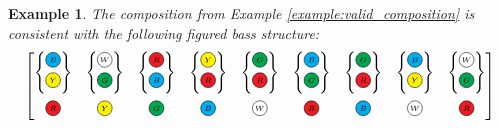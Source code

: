 \documentclass{scrartcl}
\newcommand{\RRR}{
  \begin{tikzpicture}
    \node[circle, draw, fill=Red, inner sep= 0pt, text width=1em, align=center] (n) at (0,0) {$\scriptscriptstyle R$};
  \end{tikzpicture}
}
\newcommand{\WWW}{
  \begin{tikzpicture}
    \node[circle, draw, fill=White,  inner sep= 0pt, text width=1em, align=center] (n) at (0,0) {$\scriptscriptstyle W$};
  \end{tikzpicture}
}
\newcommand{\BBB}{
  \begin{tikzpicture}
    \node[circle, draw, fill=Cyan,  inner sep= 0pt, text width=1em, align=center] (n) at (0,0) {$\scriptscriptstyle B$};
  \end{tikzpicture}
}
\newcommand{\GGG}{
  \begin{tikzpicture}
    \node[circle, draw, fill=Green,  inner sep= 0pt, text width=1em, align=center] (n) at (0,0) {$\scriptscriptstyle G$};
  \end{tikzpicture}
}
\newcommand{\YYY}{
  \begin{tikzpicture}
    \node[circle, draw, fill=Yellow,  inner sep= 0pt, text width=1em, align=center] (n) at (0,0) {$\scriptscriptstyle Y$};
  \end{tikzpicture}
}
\newtheorem{example}{Example}
\numberwithin{example}{section}
\begin{document}
\begin{example} 
The composition from Example \ref{example:valid_composition} is consistent with
the following figured bass structure:
\begin{equation}\nonumber
\begin{bmatrix}
\begin{Bmatrix} \BBB \\ \YYY \end{Bmatrix} &
\begin{Bmatrix} \WWW \\ \GGG \end{Bmatrix} &
\begin{Bmatrix} \RRR \\ \BBB \end{Bmatrix} &
\begin{Bmatrix} \YYY \\ \RRR \end{Bmatrix} &
\begin{Bmatrix} \GGG \\ \RRR \end{Bmatrix} &
\begin{Bmatrix} \BBB \\ \GGG \end{Bmatrix} &
\begin{Bmatrix} \GGG \\ \RRR \end{Bmatrix} &
\begin{Bmatrix} \BBB \\ \YYY \end{Bmatrix} &
\begin{Bmatrix} \WWW \\ \GGG \end{Bmatrix} \\ \addlinespace
\RRR & \YYY & \GGG & \BBB & \WWW & \RRR & \BBB & \WWW & \RRR
\end{bmatrix}
\end{equation}
\end{example}
\end{document}
